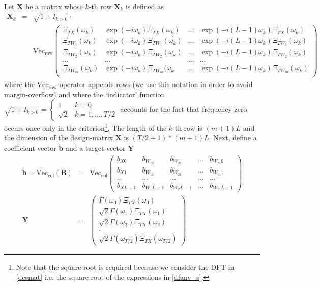 \documentclass[a4paper]{book}
\begin{document}
Let $\mathbf{X}$ be a matrix whose $k$-th row $\mathbf{X}_k$ is defined as
\begin{eqnarray}\label{desmat}
\mathbf{X}_k&=&\sqrt{1+I_{k>0}}\cdot\nonumber\\
&&\textrm{Vec}_\textrm{row}\left(\begin{array}{ccccc} \Xi_{TX}(\omega_k)& \exp(-i\omega_k)\Xi_{TX}(\omega_k)&...& \exp(-i(L-1)\omega_k)\Xi_{TX}(\omega_k)\\
 \Xi_{TW_1}(\omega_k)& \exp(-i\omega_k)\Xi_{TW_1}(\omega_k)& ...& \exp(-i(L-1)\omega_k)\Xi_{TW_1}(\omega_k)\\
 \Xi_{TW_2}(\omega_k)& \exp(-i\omega_k)\Xi_{TW_2}(\omega_k)& ...& \exp(-i(L-1)\omega_k)\Xi_{TW_2}(\omega_k)\\
...&...&...&...\\
 \Xi_{TW_m}(\omega_k)& \exp(-i\omega_k)\Xi_{TW_m}(\omega_k&...& \exp(-i(L-1)\omega_k)\Xi_{TW_m}(\omega_k)\\
\end{array}\right)
\end{eqnarray}
where the $\textrm{Vec}_\textrm{row}$-operator appends rows (we use this notation in order to avoid margin-overflow) and where the `indicator' function $\sqrt{1+I_{k>0}}=\left\{\begin{array}{cc}1&k=0\\ \sqrt{2}&k=1,...,T/2\end{array}\right.$ accounts for the fact that frequency zero occurs once only in the criterion\footnote{Note that the square-root is required because we consider the DFT in \ref{desmat} i.e. the square root of the expressions in \ref{dfanv_s}.}. The length of the $k$-th row is $(m+1)L$ and the dimension of the design-matrix $\mathbf{X}$ is $(T/2+1)*(m+1)L$. Next, define a coefficient vector $\mathbf{b}$ and a target vector $\mathbf{Y}$
\begin{eqnarray*}
\mathbf{b}=\textrm{Vec}_\textrm{col}(\mathbf{B})&=&\textrm{Vec}_\textrm{col}\left(\begin{array}{ccccc} b_{X0}&b_{W_10}&b_{W_20}&...&b_{W_m0}\\
b_{X1}&b_{W_11}&b_{W_21}&...&b_{W_m1}\\
...&...&...&...&...\\
b_{XL-1}&b_{W_1L-1}&b_{W_2L-1}&...&b_{W_mL-1}
\end{array}\right)\\
\mathbf{Y}&=&\left(\begin{array}{c}\Gamma(\omega_0)\Xi_{TX}(\omega_0)\\ 
\sqrt{2}\Gamma(\omega_1)\Xi_{TX}(\omega_1)\\
\sqrt{2}\Gamma(\omega_2)\Xi_{TX}(\omega_2)\\
.\\
\sqrt{2}\Gamma(\omega_{T/2})\Xi_{TX}(\omega_{T/2})
\end{array}\right)
\end{eqnarray*}
\end{document}
